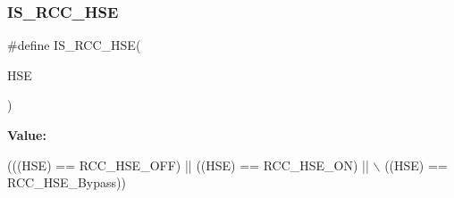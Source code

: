 \subsubsection{\texorpdfstring{I\+S\+\_\+\+R\+C\+C\+\_\+\+H\+SE}{IS\_RCC\_HSE}}
{\footnotesize\ttfamily \#define I\+S\+\_\+\+R\+C\+C\+\_\+\+H\+SE(\begin{DoxyParamCaption}\item[{}]{H\+SE }\end{DoxyParamCaption})}

{\bfseries Value\+:}
\begin{DoxyCode}
(((HSE) == RCC\_HSE\_OFF) || ((HSE) == RCC\_HSE\_ON) || \(\backslash\)
                         ((HSE) == RCC\_HSE\_Bypass))
\end{DoxyCode}
